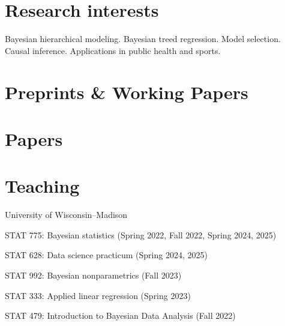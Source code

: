 \documentclass[10pt]{article}
\renewenvironment{itemize}{
  \begin{list}{}{
    \setlength{\leftmargin}{1.5em}
  }
}{
  \end{list}
}
\begin{document}
\section*{Research interests}
\begin{itemize}
\item{Bayesian hierarchical modeling. Bayesian treed regression. Model selection. Causal inference. Applications in public health and sports.}
\end{itemize}

\section*{Preprints \& Working Papers}
\nocite{*}
\printbibliography[heading=none]

\section*{Papers}
\nocite{*}
\printbibliography[heading=none]

\section*{Teaching}

\begin{itemize}
\item{University of Wisconsin--Madison}
\begin{itemize}
\item{STAT 775: Bayesian statistics (Spring 2022, Fall 2022, Spring 2024, 2025)}
\item{STAT 628: Data science practicum (Spring 2024, 2025)}
\item{STAT 992: Bayesian nonparametrics (Fall 2023)}
\item{STAT 333: Applied linear regression (Spring 2023)}
\item{STAT 479: Introduction to Bayesian Data Analysis (Fall 2022)}
\end{itemize}
\end{itemize}
\end{document}
